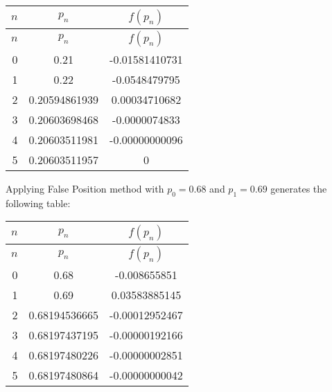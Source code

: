 \documentclass[../../../../Assignments]{subfiles}
\begin{document}
\begin{solution}
\begin{enumerate}[label = \alph*)]
            \begin{longtable}{r S[table-format=1.11] S[table-format=-1.11]}
                \toprule
                \(n\)  &    {\(p_n\)}    &   {\(f(p_n)\)}   \\
                \midrule
                \endfirsthead
                \(n\)  &    {\(p_n\)}    &   {\(f(p_n)\)}   \\
                \midrule
                  &  0.21           &  -0.01581410731  \\
                    1  &  0.22           &  -0.0548479795   \\
                    2  &  0.20594861939  &   0.00034710682  \\
                    3  &  0.20603698468  &  -0.0000074833   \\
                    4  &  0.20603511981  &  -0.00000000096  \\
                    5  &  0.20603511957  &   0              \\
                \bottomrule
            \end{longtable}

            Applying False Position method with \(p_0 = \num{0.68}\) and \(p_1 =
            \num{0.69}\) generates the following table:

            \begin{longtable}{r S[table-format=1.11] S[table-format=-1.11]}
                \toprule
                \(n\)  &    {\(p_n\)}    &   {\(f(p_n)\)}   \\
                \midrule
                \endfirsthead
                \(n\)  &    {\(p_n\)}    &   {\(f(p_n)\)}   \\
                \midrule
                  &  0.68           &  -0.008655851    \\
                    1  &  0.69           &   0.03583885145  \\
                    2  &  0.68194536665  &  -0.00012952467  \\
                    3  &  0.68197437195  &  -0.00000192166  \\
                    4  &  0.68197480226  &  -0.00000002851  \\
                    5  &  0.68197480864  &  -0.00000000042  \\
                \bottomrule
            \end{longtable}
    \end{enumerate}
\end{solution}
\end{document}

